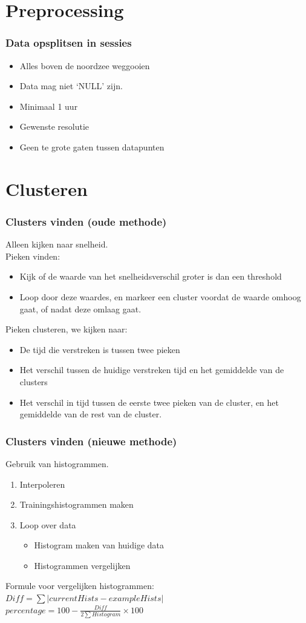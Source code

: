 \documentclass{beamer}
\newcommand{\slide}[2]
{
\begin{frame}
\frametitle{#1} 

#2

\end{frame}
}
\begin{document}
\section{Preprocessing}
\slide{Data opsplitsen in sessies}
{
\begin{itemize}
    \item Alles boven de noordzee weggooien
    \item Data mag niet `NULL' zijn.
    \item Minimaal 1 uur
    \item Gewenste resolutie
    \item Geen te grote gaten tussen datapunten
\end{itemize}
}

\section{Clusteren}
\slide{Clusters vinden (oude methode)}
{
     Alleen kijken naar snelheid.\\
     Pieken vinden:
 \begin{itemize}
    \item Kijk of de waarde van het snelheidsverschil groter is dan een
    threshold
    \item Loop door deze waardes, en markeer een cluster voordat de waarde omhoog
    gaat, of nadat deze omlaag gaat.
 \end{itemize}
    Pieken clusteren, we kijken naar:
    \begin{itemize}
 \item De tijd die verstreken is tussen twee pieken
 \item Het verschil tussen de huidige verstreken tijd en het gemiddelde van de
 clusters
 \item Het verschil in tijd tussen de eerste twee pieken van de cluster, en het
 gemiddelde van de rest van de cluster.
 \end{itemize}

}


\slide{Clusters vinden (nieuwe methode)}
{
    Gebruik van histogrammen.
\begin{enumerate}
    \item Interpoleren
    \item Trainingshistogrammen maken
    \item Loop over data
    \begin{itemize}
        \item Histogram maken van huidige data
        \item Histogrammen vergelijken
    \end{itemize}
\end{enumerate}

Formule voor vergelijken histogrammen:\\
\hspace{.5cm} $Diff =  \sum \left| currentHists - exampleHists
\right|$\\
\hspace{.5cm} $percentage = 100 - \frac{Diff}{2 \sum Histogram} \times 100$
}
\end{document}
